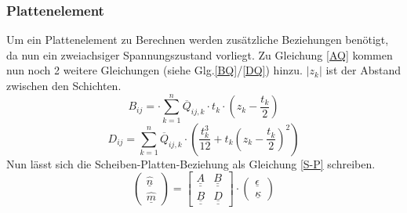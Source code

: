 \subsubsection{Plattenelement}
Um ein Plattenelement zu Berechnen werden zusätzliche Beziehungen benötigt, da nun ein zweiachsiger Spannungszustand vorliegt. Zu Gleichung \ref{AQ} kommen nun noch 2 weitere Gleichungen (siehe Glg.\ref{BQ}/\ref{DQ}) hinzu. $|z_{k}|$ ist der Abstand zwischen den Schichten.
\begin{equation}
\label{BQ}
	B_{ij}= \cdot \sum_{k=1}^{n} \overline{Q}_{ij,k}\cdot t_{k}\cdot \left(z_{k}-\frac{t_{k}}{2}\right)
\end{equation}
\begin{equation}
\label{DQ} 
	D_{ij}=\sum_{k=1}^{n} \overline{Q}_{ij,k}\cdot \left(\frac{t_{k}^{3}}{12}+t_{k}\left(z_{k}-\frac{t_{k}}{2}\right)^{2}\right)
\end{equation}
\noindent
Nun lässt sich die Scheiben-Platten-Beziehung als Gleichung \ref{S-P} schreiben.\cite{item3}
\begin{equation}
\label{S-P}
	\begin{pmatrix}
		\hat{\underline{n}}\\
		\hat{\underline{m}}
	\end{pmatrix}
	= \begin{bmatrix}
		\underline{\underline{A}}&\underline{\underline{B}}\\
		\underline{\underline{B}}&\underline{\underline{D}}
	\end{bmatrix}
	\cdot \begin{pmatrix}
		\underline{\epsilon}\\
		\underline{\kappa}
	\end{pmatrix}
\end{equation}\\


\newpage
